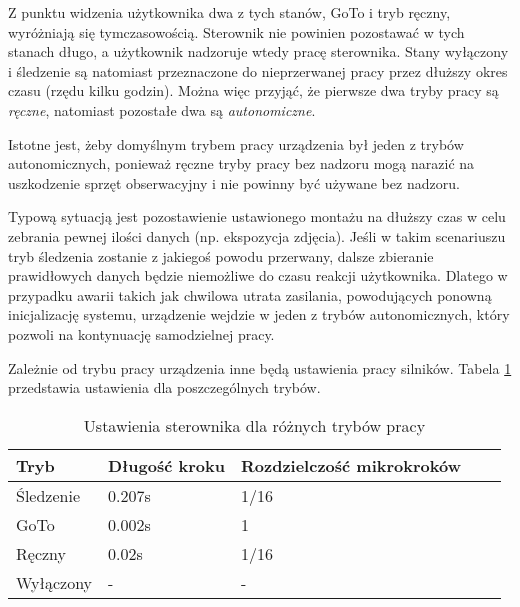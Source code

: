 Z punktu widzenia użytkownika dwa z tych stanów, GoTo i tryb ręczny, wyróżniają
się tymczasowością. Sterownik nie powinien pozostawać w tych stanach długo,
a użytkownik nadzoruje wtedy pracę sterownika. Stany wyłączony i śledzenie są
natomiast przeznaczone do nieprzerwanej pracy przez dłuższy okres czasu (rzędu
kilku godzin). Można więc przyjąć, że pierwsze dwa tryby pracy są \emph{ręczne},
natomiast pozostałe dwa są \emph{autonomiczne}.

Istotne jest, żeby domyślnym trybem pracy urządzenia był jeden z trybów
autonomicznych, ponieważ ręczne tryby pracy bez nadzoru mogą narazić na
uszkodzenie sprzęt obserwacyjny i nie powinny być używane bez nadzoru.

Typową sytuacją jest pozostawienie ustawionego montażu na dłuższy czas w celu
zebrania pewnej ilości danych (np. ekspozycja zdjęcia). Jeśli w takim
scenariuszu tryb śledzenia zostanie z jakiegoś powodu przerwany, dalsze
zbieranie prawidłowych danych będzie niemożliwe do czasu reakcji użytkownika.
Dlatego w przypadku awarii takich jak chwilowa utrata zasilania, powodujących
ponowną inicjalizację systemu, urządzenie wejdzie w jeden z trybów
autonomicznych, który pozwoli na kontynuację samodzielnej pracy.

Zależnie od trybu pracy urządzenia inne będą ustawienia pracy silników. Tabela
\ref{tab_settings} przedstawia ustawienia dla poszczególnych trybów.

\begin{table}[t]

\caption{Ustawienia sterownika dla różnych trybów pracy} \label{tab_settings}

\begin{tabular}{|l|l|l|l|l|}

\hline Tryb	& Długość kroku	& Rozdzielczość mikrokroków \\

\hline Śledzenie & 0.207s	& 1/16 \\

\hline GoTo	& 0.002s	& 1 \\

\hline Ręczny	& 0.02s		& 1/16 \\

\hline Wyłączony & -		& - \\

\hline 

\end{tabular}

\end{table}

